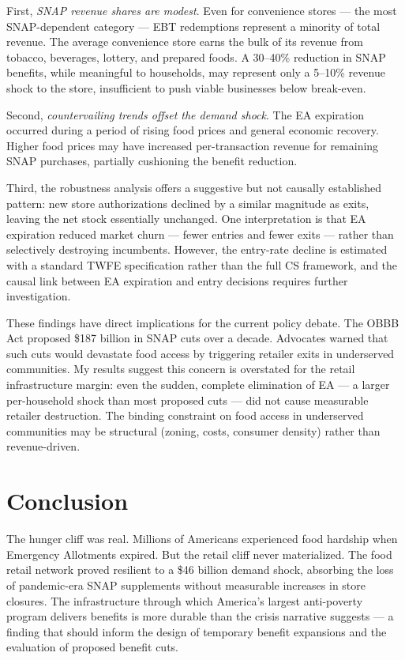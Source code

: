 \documentclass[12pt]{article}
\begin{document}
First, \textit{SNAP revenue shares are modest}. Even for convenience stores --- the most SNAP-dependent category --- EBT redemptions represent a minority of total revenue. The average convenience store earns the bulk of its revenue from tobacco, beverages, lottery, and prepared foods. A 30--40\% reduction in SNAP benefits, while meaningful to households, may represent only a 5--10\% revenue shock to the store, insufficient to push viable businesses below break-even.

Second, \textit{countervailing trends offset the demand shock}. The EA expiration occurred during a period of rising food prices and general economic recovery. Higher food prices may have increased per-transaction revenue for remaining SNAP purchases, partially cushioning the benefit reduction.

Third, the robustness analysis offers a suggestive but not causally established pattern: new store authorizations declined by a similar magnitude as exits, leaving the net stock essentially unchanged. One interpretation is that EA expiration reduced market churn --- fewer entries and fewer exits --- rather than selectively destroying incumbents. However, the entry-rate decline is estimated with a standard TWFE specification rather than the full CS framework, and the causal link between EA expiration and entry decisions requires further investigation.

These findings have direct implications for the current policy debate. The OBBB Act proposed \$187 billion in SNAP cuts over a decade. Advocates warned that such cuts would devastate food access by triggering retailer exits in underserved communities. My results suggest this concern is overstated for the retail infrastructure margin: even the sudden, complete elimination of EA --- a larger per-household shock than most proposed cuts --- did not cause measurable retailer destruction. The binding constraint on food access in underserved communities may be structural (zoning, costs, consumer density) rather than revenue-driven.

\section{Conclusion}

The hunger cliff was real. Millions of Americans experienced food hardship when Emergency Allotments expired. But the retail cliff never materialized. The food retail network proved resilient to a \$46 billion demand shock, absorbing the loss of pandemic-era SNAP supplements without measurable increases in store closures. The infrastructure through which America's largest anti-poverty program delivers benefits is more durable than the crisis narrative suggests --- a finding that should inform the design of temporary benefit expansions and the evaluation of proposed benefit cuts.
\end{document}
